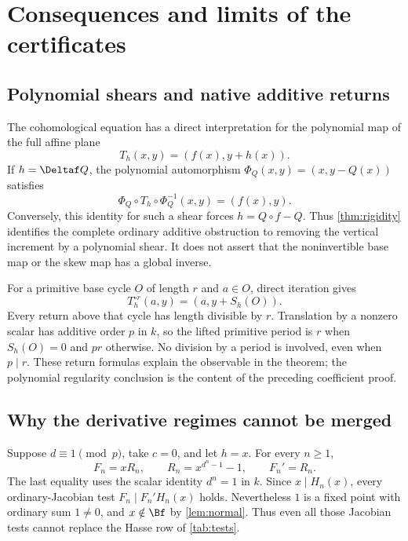 \section{Consequences and limits of the certificates}
\label{sec:consequences}

\subsection{Polynomial shears and native additive returns}

The cohomological equation has a direct interpretation for the
polynomial map of the full affine plane
\[
 T_h(x,y)=(f(x),y+h(x)).
\]
If $h=\Deltaf Q$, the polynomial automorphism
$\Phi_Q(x,y)=(x,y-Q(x))$ satisfies
\[
 \Phi_Q\circ T_h\circ\Phi_Q^{-1}(x,y)=(f(x),y).
\]
Conversely, this identity for such a shear forces
$h=Q\circ f-Q$. Thus \cref{thm:rigidity} identifies the complete
ordinary additive obstruction to removing the vertical increment
by a polynomial shear. It does not assert that the noninvertible
base map or the skew map has a global inverse.

For a primitive base cycle $O$ of length $r$ and $a\in O$,
direct iteration gives
\[
 T_h^{\circ r}(a,y)=(a,y+S_h(O)).
\]
Every return above that cycle has length divisible by $r$.
Translation by a nonzero scalar has additive order $p$ in $k$,
so the lifted primitive period is $r$ when $S_h(O)=0$ and
$pr$ otherwise. No division by a period is involved, even when
$p\mid r$. These return formulas explain the observable in
the theorem; the polynomial regularity conclusion is the content
of the preceding coefficient proof.

\subsection{Why the derivative regimes cannot be merged}

\begin{example}
\label{ex:blind-jacobian}
Suppose $d\equiv1\pmod p$, take $c=0$, and let $h=x$.
For every $n\ge1$,
\[
 F_n=xR_n,\qquad R_n=x^{d^n-1}-1,
 \qquad F_n'=R_n.
\]
The last equality uses the scalar identity $d^n=1$ in $k$.
Since $x\mid H_n(x)$, every ordinary-Jacobian test
$F_n\mid F_n'H_n(x)$ holds. Nevertheless $1$ is a fixed
point with ordinary sum $1\ne0$, and $x\notin\Bf$ by
\cref{lem:normal}. Thus even all those Jacobian tests cannot
replace the Hasse row of \cref{tab:tests}.
\end{example}

